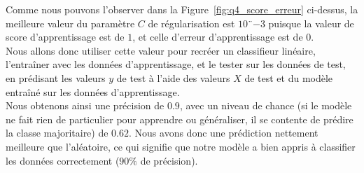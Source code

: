 \documentclass{article}
\begin{document}
Comme nous pouvons l'observer dans la Figure~\ref{fig:q4_score_erreur} ci-dessus, la meilleure valeur du paramètre $C$ de régularisation est $10¨{-3}$ puisque la valeur de score d'apprentissage est de $1$, et celle d'erreur d'apprentissage est de $0$.\\

Nous allons donc utiliser cette valeur pour recréer un classifieur linéaire, l'entraîner avec les données d'apprentissage, et le tester sur les données de test, en prédisant les valeurs $y$ de test à l'aide des valeurs $X$ de test et du modèle entraîné sur les données d'apprentissage.\\
Nous obtenons ainsi une précision de $0.9$, avec un niveau de chance (si le modèle ne fait rien de particulier pour apprendre ou généraliser, il se contente de prédire la classe majoritaire) de $0.62$. Nous avons donc une prédiction nettement meilleure que l'aléatoire, ce qui signifie que notre modèle a bien appris à classifier les données correctement ($90\%$ de précision).\\
\end{document}
